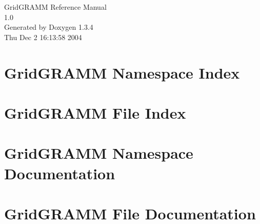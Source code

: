 \documentclass[a4paper]{book}
\begin{document}
\begin{titlepage}
\vspace*{7cm}
\begin{center}
{\Large Grid\-GRAMM Reference Manual\\[1ex]\large 1.0 }\\
\vspace*{1cm}
{\large Generated by Doxygen 1.3.4}\\
\vspace*{0.5cm}
{\small Thu Dec 2 16:13:58 2004}\\
\end{center}
\end{titlepage}
\clearemptydoublepage
{}
\tableofcontents
\clearemptydoublepage
{}
\chapter{Grid\-GRAMM Namespace Index}

\chapter{Grid\-GRAMM File Index}

\chapter{Grid\-GRAMM Namespace Documentation}

\chapter{Grid\-GRAMM File Documentation}





\printindex
\end{document}
